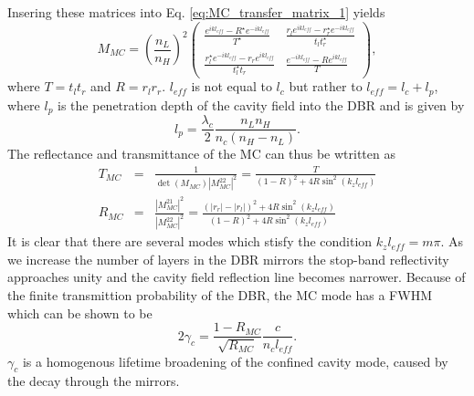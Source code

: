 Insering these matrices into Eq. \ref{eq:MC_transfer_matrix_1} yields
\begin{equation}
M_{MC}=\left(\frac{n_{L}}{n_{H}}\right)^{2}\left(\begin{array}{cc}
\frac{e^{ikl_{eff}}-R^{\star}e^{-ikl_{eff}}}{T^{\star}} & \frac{r_{l}e^{ikl_{eff}}-r_{r}^{\star}e^{-ikl_{eff}}}{t_{l}t_{r}^{\star}}\\
\frac{r_{l}^{\star}e^{-ikl_{eff}}-r_{r}e^{ikl_{eff}}}{t_{l}^{\star}t_{r}} & \frac{e^{-ikl_{eff}}-Re^{ikl_{eff}}}{T}\end{array}\right),\end{equation}
where $T=t_{l}t_{r}$ and $R=r_{l}r_{r}$. $l_{eff}$ is not equal
to $l_{c}$ but rather to $l_{eff}=l_{c}+l_{p}$, where $l_{p}$ is
the penetration depth of the cavity field into the DBR \citet{Savona1995}
and is given by \begin{equation}
l_{p}=\frac{\lambda_{c}}{2}\frac{n_{L}n_{H}}{n_{c}\left(n_{H}-n_{L}\right)}.\end{equation}
The reflectance and transmittance of the MC can thus be wtritten as
\begin{eqnarray}
T_{MC} & = & \frac{1}{\det\left(M_{MC}\right)|M_{MC}^{22}|^{2}}=\frac{T}{\left(1-R\right)^{2}+4R\sin^{2}\left(k_{z}l_{eff}\right)}\\
R_{MC} & = & \frac{|M_{MC}^{21}|^{2}}{|M_{MC}^{22}|^{2}}=\frac{\left(|r_{r}|-|r_{l}|\right)^{2}+4R\sin^{2}\left(k_{z}l_{eff}\right)}{\left(1-R\right)^{2}+4R\sin^{2}\left(k_{z}l_{eff}\right)}\end{eqnarray}
It is clear that there are several modes which stisfy the condition
$k_{z}l_{eff}=m\pi$. As we increase the number of layers in the DBR
mirrors the stop-band reflectivity approaches unity and the cavity
field reflection line becomes narrower. Because of the finite transmittion
probability of the DBR, the MC mode has a FWHM which can be shown
to be \citet{Savona1995} \begin{equation}
2\gamma_{c}=\frac{1-R_{MC}}{\sqrt{R_{MC}}}\frac{c}{n_{c}l_{eff}}.\end{equation}
$\gamma_{c}$ is a homogenous lifetime broadening of the confined
cavity mode, caused by the decay through the mirrors.

